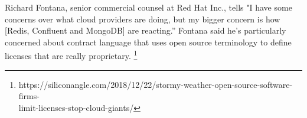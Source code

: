 \documentclass[12pt, a4paper]{article}
\begin{document}
  Richard Fontana, senior commercial counsel at Red Hat Inc., tells "I have some concerns over what cloud providers are doing, but my bigger concern is how [Redis, Confluent and MongoDB] are reacting.” Fontana said he's particularly concerned about contract language that uses open source terminology to define licenses that are really proprietary. 
  \footnote{https://siliconangle.com/2018/12/22/stormy-weather-open-source-software-firms-\\limit-licenses-stop-cloud-giants/}


\end{document}
